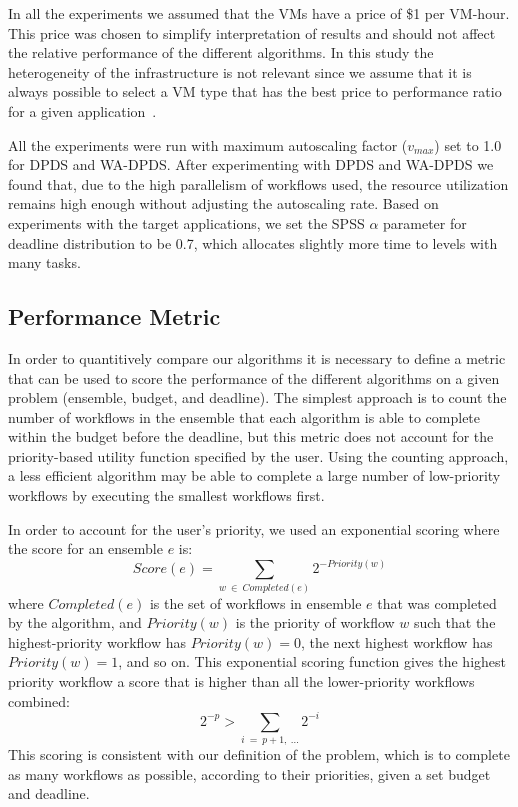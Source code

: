 \documentclass[conference]{IEEEtran}
\begin{document}
In all the experiments we assumed that the VMs have a price of \$1 per VM-hour.
This price was chosen to simplify interpretation of results and should not
affect the relative performance of the different algorithms. In this study the
heterogeneity of the infrastructure is not relevant since we assume that it is
always possible to select a VM type that has the best price to performance ratio
for a given application~\cite{Juve2009}.


All the experiments were run with maximum autoscaling factor ($v_{max}$) set to
1.0 for DPDS and WA-DPDS. After experimenting with DPDS and WA-DPDS we found
that, due to the high parallelism of workflows used, the resource utilization
remains high enough without adjusting the autoscaling rate. Based on experiments
with the target applications, we set the SPSS $\alpha$ parameter for deadline
distribution to be 0.7, which allocates slightly more time to levels with many
tasks.


\subsection{Performance Metric}
\label{sec:perf_metric}

In order to quantitively compare our algorithms it is necessary to define a
metric that can be used to score the performance of the different algorithms on
a given problem (ensemble, budget, and deadline). The simplest approach is to
count the number of workflows in the ensemble that each algorithm is able to
complete within the budget before the deadline, but this metric does not account
for the priority-based utility function specified by the user. Using the
counting approach, a less efficient algorithm may be able to complete a large
number of low-priority workflows by executing the smallest workflows first.


In order to account for the user's priority, we used an exponential scoring where the score for an ensemble $e$ is:
%
$$
Score(e) = \sum_{w~\in~Completed(e)}{2^{-Priority(w)}}
$$
%
where $Completed(e)$ is the set of workflows in ensemble $e$ that was completed by the algorithm, and $Priority(w)$ is the priority of workflow $w$ such that the highest-priority workflow has $Priority(w)=0$, the next highest workflow has $Priority(w)=1$, and so on. This exponential scoring function gives the highest priority workflow a score that is higher than all the lower-priority workflows combined:
%
$$
2^{-p} > \sum_{i~=~p+1,~\ldots}2^{-i}
$$
%
This scoring is consistent with our definition of the problem, which is to complete as many workflows as possible, according to their priorities, given a set budget and deadline.
\end{document}
